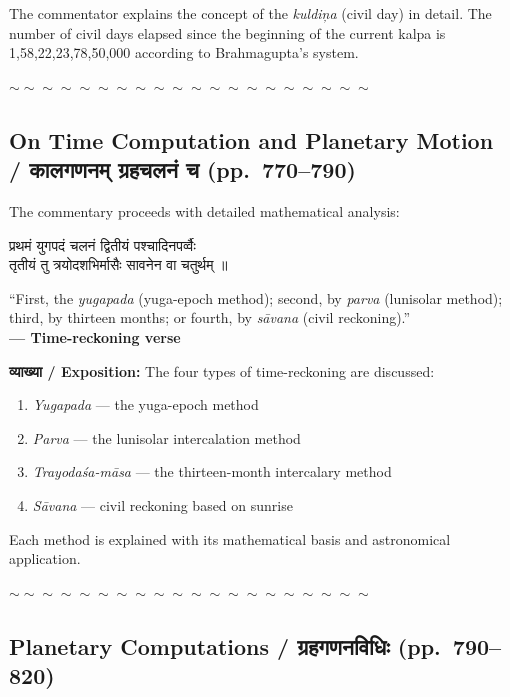 \documentclass[11pt,a4paper]{article}
\newcommand{\dev}[1]{{\devanagarifont #1}}
\newenvironment{bilingualverse}{%
  \begin{paracol}{2}
  \fontsize{10.5}{13}\selectfont
}{%
  \end{paracol}
  \vspace{0.3cm}
}
\newcommand{\wavydivider}{\begin{center}$\sim\sim\sim\sim\sim\sim\sim\sim\sim\sim\sim\sim\sim\sim\sim\sim\sim\sim\sim\sim$\end{center}}
\newenvironment{paracol}[1]{\begingroup}{\endgroup}
\newenvironment{leftcolumn*}{\begingroup}{\endgroup}
\newenvironment{rightcolumn}{\begingroup}{\endgroup}
\begin{document}
\vspace{0.3cm}
The commentator explains the concept of the \textit{kuldiņa} (civil day) in detail. The number of civil days elapsed since the beginning of the current kalpa is 1,58,22,23,78,50,000 according to Brahmagupta's system.

\wavydivider

\subsection*{On Time Computation and Planetary Motion / \dev{कालगणनम् ग्रहचलनं च} (pp.\ 770--790)}

The commentary proceeds with detailed mathematical analysis:

\begin{bilingualverse}
\begin{leftcolumn*}
\dev{प्रथमं युगपदं चलनं द्वितीयं पश्चादिनपर्व्वैः}\\
\dev{तृतीयं तु त्रयोदशभिर्मासैः सावनेन वा चतुर्थम् ॥}
\end{leftcolumn*}
\begin{rightcolumn}
``First, the \textit{yugapada} (yuga-epoch method); second, by \textit{parva} (lunisolar method); third, by thirteen months; or fourth, by \textit{sāvana} (civil reckoning).''\\[0.3cm]
\hfill\textbf{— Time-reckoning verse}
\end{rightcolumn}
\end{bilingualverse}

\textbf{\dev{व्याख्या} / Exposition:} The four types of time-reckoning are discussed:
\begin{enumerate}[label=(\roman*),leftmargin=2em]
  \item \textit{Yugapada} --- the yuga-epoch method
  \item \textit{Parva} --- the lunisolar intercalation method
  \item \textit{Trayodaśa-māsa} --- the thirteen-month intercalary method
  \item \textit{Sāvana} --- civil reckoning based on sunrise
\end{enumerate}
Each method is explained with its mathematical basis and astronomical application.

\wavydivider

\subsection*{Planetary Computations / \dev{ग्रहगणनविधिः} (pp.\ 790--820)}
\end{document}
